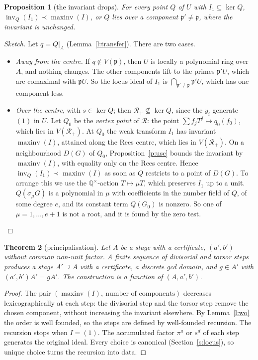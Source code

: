 \documentclass[11pt]{article}
\newcommand{\Q}{\mathbb{Q}}
\newcommand{\p}{\mathfrak{p}}
\newcommand{\cR}{\mathcal{R}}
\newcommand{\inv}{\operatorname{inv}}
\newcommand{\maxinv}{\operatorname{maxinv}}
\numberwithin{equation}{section}
\theoremstyle{plain}
\newtheorem{theorem}{Theorem}[section]
\newtheorem{proposition}[theorem]{Proposition}
\theoremstyle{definition}
\theoremstyle{remark}
\begin{document}
\begin{proposition}[the invariant drops]\label{p:drop}
For every point $Q$ of $U$ with $I_1\subseteq\ker Q$, $\inv_Q(I_1)\prec\maxinv(I)$, or $Q$ lies over
a component $\p'\ne\p$, where the invariant is unchanged.
\end{proposition}

\begin{proof}[Sketch]
Let $q=Q|_A$ (Lemma~\ref{l:transfer}). There are two cases.
\begin{itemize}
\item \emph{Away from the centre.} If $q\notin V(\p)$, then $U$ is locally a polynomial ring over
  $A$, and nothing changes. The other components lift to the primes $\p'U$, which are comaximal
  with $\p U$. So the locus ideal of $I_1$ is $\bigcap_{\p'\ne\p}\p'U$, which has one component
  less.
\item \emph{Over the centre}, with $s\in\ker Q$; then $\cR_+\not\subseteq\ker Q$, since the $y_i$
  generate $(1)$ in $U$. Let $Q_0$ be the \emph{vertex point} of $\cR$: the point
  $\sum f_jT^j\mapsto q_0(f_0)$, which lies in $V(\cR_+)$. At $Q_0$ the weak transform $I_1$ has
  invariant $\maxinv(I)$, attained along the Rees centre, which lies in $V(\cR_+)$. On a
  neighbourhood $D(G)$ of $Q_0$, Proposition~\ref{p:usc} bounds the invariant by $\maxinv(I)$, with
  equality only on the Rees centre. Hence $\inv_Q(I_1)\prec\maxinv(I)$ as soon as $Q$ restricts to a
  point of $D(G)$. To arrange this we use the $\Q^\times$-action $T\mapsto\mu T$, which preserves
  $I_1$ up to a unit. $Q(\sigma_\mu G)$ is a polynomial in $\mu$ with coefficients in the number
  field of $Q$, of some degree $e$, and its constant term $Q(G_0)$ is nonzero. So one of
  $\mu=1,\dots,e+1$ is not a root, and it is found by the zero test.\qedhere
\end{itemize}
\end{proof}

\begin{theorem}[principalisation]\label{t:princ}
Let $A$ be a stage with a certificate, $(a',b')$ without common non-unit factor. A finite sequence of
divisorial and torsor steps produces a stage $A'\supseteq A$ with a certificate, a discrete gcd
domain, and $g\in A'$ with $(a',b')A'=gA'$. The construction is a function of $(A,a',b')$.
\end{theorem}

\begin{proof}
The pair $(\maxinv(I),\ \text{number of components})$ decreases lexicographically at each step: the
divisorial step and the torsor step remove the chosen component, without increasing the invariant
elsewhere. By Lemma~\ref{l:wo} the order is well founded, so the steps are defined by well-founded
recursion. The recursion stops when $I=(1)$. The accumulated factor
$\pi^a$ or $s^d$ of each step generates the original ideal. Every choice is canonical
(Section~\ref{s:locus}), so unique choice turns the recursion into data.
\end{proof}
\end{document}
